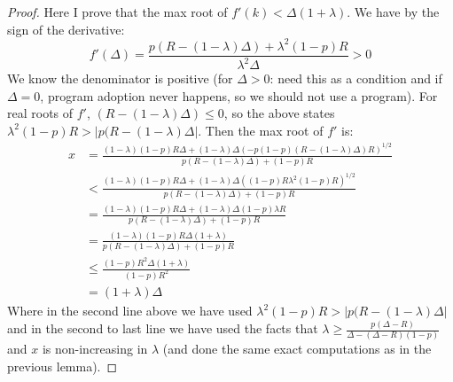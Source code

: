 \documentclass{article}
\begin{document}
\begin{proof}
Here I prove that the max root of $f'(k) < \Delta(1+\lambda)$. We have by the sign of the derivative:
\begin{equation*}
f'(\Delta) = \frac{p(R-(1-\lambda)\Delta)+\lambda^2(1-p)R}{\lambda^2\Delta} > 0
\end{equation*}
We know the denominator is positive (for $\Delta > 0$: need this as a condition and if $\Delta = 0$, program adoption never happens, so we should not use a program). For real roots of $f'$, $(R-(1-\lambda)\Delta) \leq 0$, so the above states $\lambda^2(1-p)R > |p(R-(1-\lambda)\Delta|$. Then the max root of $f'$ is:
\begin{align*}
x &= \frac{(1-\lambda)(1-p)R\Delta+(1-\lambda)\Delta(-p(1-p)(R-(1-\lambda)\Delta)R)^{1/2}}{p(R-(1-\lambda)\Delta)+(1-p)R} \\
&< \frac{(1-\lambda)(1-p)R\Delta+(1-\lambda)\Delta((1-p)R\lambda^2(1-p)R)^{1/2}}{p(R-(1-\lambda)\Delta)+(1-p)R} \\
&= \frac{(1-\lambda)(1-p)R\Delta+(1-\lambda)\Delta(1-p)\lambda R}{p(R-(1-\lambda)\Delta)+(1-p)R} \\
&= \frac{(1-\lambda)(1-p)R\Delta(1+\lambda)}{p(R-(1-\lambda)\Delta)+(1-p)R} \\
&\leq \frac{(1-p)R^2\Delta(1+\lambda)}{(1-p)R^2} \\
&= (1+\lambda)\Delta
\end{align*}
Where in the second line above we have used $\lambda^2(1-p)R > |p(R-(1-\lambda)\Delta|$ and in the second to last line we have used the facts that $\lambda \geq \frac{p(\Delta-R)}{\Delta-(\Delta-R)(1-p)}$ and $x$ is non-increasing in $\lambda$ (and done the same exact computations as in the previous lemma).
\end{proof}
\end{document}

